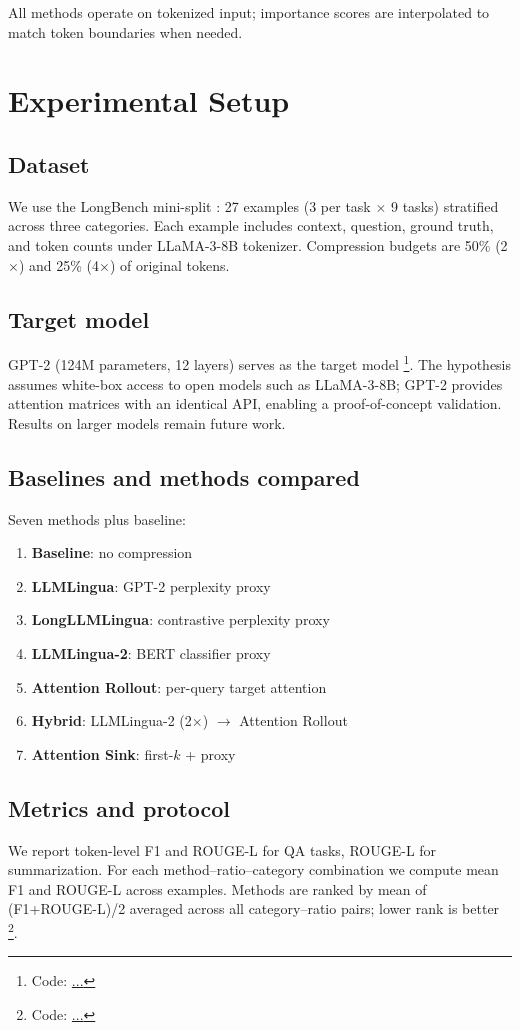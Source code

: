 \documentclass[11pt,letterpaper]{article}
\begin{document}
All methods operate on tokenized input; importance scores are interpolated to match token boundaries when needed.

\section{Experimental Setup}

\subsection{Dataset}
We use the LongBench mini-split \citep{Bai2024}: 27 examples (3 per task $\times$ 9 tasks) stratified across three categories. Each example includes context, question, ground truth, and token counts under LLaMA-3-8B tokenizer. Compression budgets are 50\% (2$\times$) and 25\% (4$\times$) of original tokens.

\subsection{Target model}
GPT-2 (124M parameters, 12 layers) serves as the target model \footnote{Code: \url{...}}. The hypothesis assumes white-box access to open models such as LLaMA-3-8B; GPT-2 provides attention matrices with an identical API, enabling a proof-of-concept validation. Results on larger models remain future work.

\subsection{Baselines and methods compared}
Seven methods plus baseline:
\begin{enumerate}
  \item \textbf{Baseline}: no compression
  \item \textbf{LLMLingua}: GPT-2 perplexity proxy
  \item \textbf{LongLLMLingua}: contrastive perplexity proxy
  \item \textbf{LLMLingua-2}: BERT classifier proxy
  \item \textbf{Attention Rollout}: per-query target attention
  \item \textbf{Hybrid}: LLMLingua-2 (2$\times$) $\to$ Attention Rollout
  \item \textbf{Attention Sink}: first-$k$ + proxy
\end{enumerate}

\subsection{Metrics and protocol}
We report token-level F1 and ROUGE-L for QA tasks, ROUGE-L for summarization. For each method--ratio--category combination we compute mean F1 and ROUGE-L across examples. Methods are ranked by mean of (F1+ROUGE-L)/2 averaged across all category--ratio pairs; lower rank is better \footnote{Code: \url{...}}.
\end{document}
